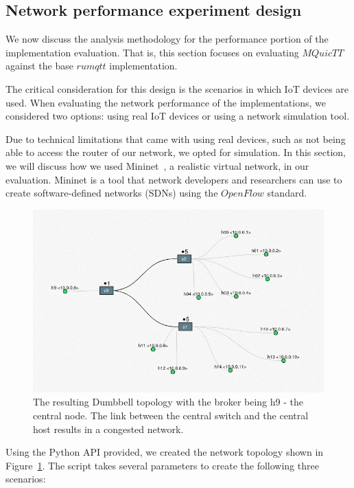 \subsection{Network performance experiment design} \label{chap:net_sim}

We now discuss the analysis methodology for the performance portion of the implementation evaluation.
That is, this section focuses on evaluating $MQuicTT$ against the base $rumqtt$ implementation.

The critical consideration for this design is the scenarios in which IoT devices are used.
When evaluating the network performance of the implementations, we considered two options: using real IoT devices or using a network simulation tool.

Due to technical limitations that came with using real devices, such as not being able to access the router of our network, we opted for simulation.
In this section, we will discuss how we used Mininet~\citep{lantz_mininet_2021}, a realistic virtual network, in our evaluation.
Mininet is a tool that network developers and researchers can use to create software-defined networks (SDNs) using the $OpenFlow$ standard.

\begin{figure}[ht]
    \centering
    \includegraphics[width=0.9\linewidth]{images/mininet_topo.png}
    \caption{The resulting Dumbbell topology with the broker being h9 - the central node. The link between the central switch and the central host results in a congested network.}
    \label{fig:mininet-topo}
\end{figure}

Using the Python API provided, we created the network topology shown in Figure~\ref{fig:mininet-topo}.
The script takes several parameters to create the following three scenarios:

